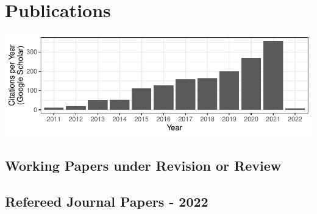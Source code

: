 \documentclass[11pt,a4paper,]{moderncv}
\begin{document}

\clearpage

\hypertarget{publications}{%
\section{Publications}\label{publications}}

\begin{center}\includegraphics{SchwartzSarah_CV_short_files/figure-latex/unnamed-chunk-1-1} \end{center}

\hypertarget{working-papers-under-revision-or-review}{%
\subsection{\texorpdfstring{\textbf{Working Papers under Revision or
Review}}{Working Papers under Revision or Review}}\label{working-papers-under-revision-or-review}}

\hypertarget{refs_journalspress}{}

\vspace{7mm}

\hypertarget{refereed-journal-papers---2022}{%
\subsection{\texorpdfstring{\textbf{Refereed Journal Papers -
2022}}{Refereed Journal Papers - 2022}}\label{refereed-journal-papers---2022}}
\end{document}
